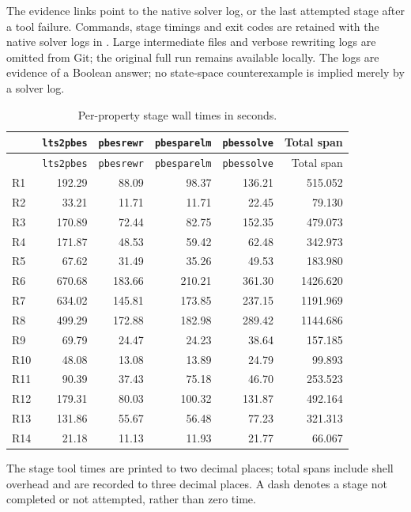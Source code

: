 \endgroup
The evidence links point to the native solver log, or the last attempted stage after a tool failure. Commands, stage timings and exit codes are retained with the native solver logs in . Large intermediate files and verbose rewriting logs are omitted from Git; the original full run remains available locally. The logs are evidence of a Boolean answer; no state-space counterexample is implied merely by a solver log.
\begingroup\small
\begin{longtable}{@{}lrrrrr@{}}
\caption{Per-property stage wall times in seconds.}\label{tab:stagetimes}\\
\toprule & \texttt{lts2pbes} & \texttt{pbesrewr} & \texttt{pbesparelm} & \texttt{pbessolve} & Total span \\ \midrule\endfirsthead
\toprule & \texttt{lts2pbes} & \texttt{pbesrewr} & \texttt{pbesparelm} & \texttt{pbessolve} & Total span \\ \midrule\endhead
\bottomrule\endlastfoot
R1 & 192.29 & 88.09 & 98.37 & 136.21 & 515.052 \\
R2 & 33.21 & 11.71 & 11.71 & 22.45 & 79.130 \\
R3 & 170.89 & 72.44 & 82.75 & 152.35 & 479.073 \\
R4 & 171.87 & 48.53 & 59.42 & 62.48 & 342.973 \\
R5 & 67.62 & 31.49 & 35.26 & 49.53 & 183.980 \\
R6 & 670.68 & 183.66 & 210.21 & 361.30 & 1426.620 \\
R7 & 634.02 & 145.81 & 173.85 & 237.15 & 1191.969 \\
R8 & 499.29 & 172.88 & 182.98 & 289.42 & 1144.686 \\
R9 & 69.79 & 24.47 & 24.23 & 38.64 & 157.185 \\
R10 & 48.08 & 13.08 & 13.89 & 24.79 & 99.893 \\
R11 & 90.39 & 37.43 & 75.18 & 46.70 & 253.523 \\
R12 & 179.31 & 80.03 & 100.32 & 131.87 & 492.164 \\
R13 & 131.86 & 55.67 & 56.48 & 77.23 & 321.313 \\
R14 & 21.18 & 11.13 & 11.93 & 21.77 & 66.067 \\
\end{longtable}
\endgroup
The stage tool times are printed to two decimal places; total spans include shell overhead and are recorded to three decimal places. A dash denotes a stage not completed or not attempted, rather than zero time.
